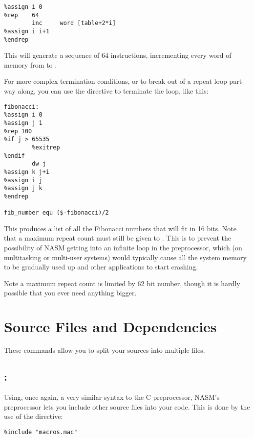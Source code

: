 \begin{lstlisting}
%assign i 0
%rep    64
        inc     word [table+2*i]
%assign i i+1
%endrep
\end{lstlisting}

This will generate a sequence of 64  instructions,
incrementing every word of memory from \code{[table]} to
\code{[table+126]}.

For more complex termination conditions, or to break out of a repeat
loop part way along, you can use the  directive to
terminate the loop, like this:

\begin{lstlisting}
fibonacci:
%assign i 0
%assign j 1
%rep 100
%if j > 65535
        %exitrep
%endif
        dw j
%assign k j+i
%assign i j
%assign j k
%endrep

fib_number equ ($-fibonacci)/2
\end{lstlisting}

This produces a list of all the Fibonacci numbers that will fit in
16 bits. Note that a maximum repeat count must still be given to
. This is to prevent the possibility of NASM getting into an
infinite loop in the preprocessor, which (on multitasking or
multi-user systems) would typically cause all the system memory to
be gradually used up and other applications to start crashing.

Note a maximum repeat count is limited by 62 bit number, though it
is hardly possible that you ever need anything bigger.

\section{Source Files and Dependencies}
\label{sec:files}

These commands allow you to split your sources into multiple files.

\label{subsec:include}
\subsection{: }

Using, once again, a very similar syntax to the C preprocessor,
NASM's preprocessor lets you include other source files into your
code. This is done by the use of the  directive:

\begin{lstlisting}
%include "macros.mac"
\end{lstlisting}

